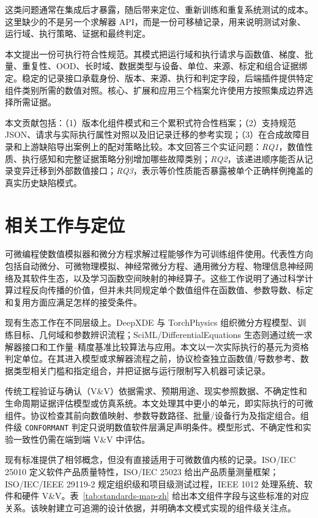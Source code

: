 \documentclass[preprint,12pt,authoryear]{elsarticle}
\begin{document}
这类问题通常在集成后才暴露，随后带来定位、重新训练和重复系统测试的成本。这里缺少的不是另一个求解器 API，而是一份可移植记录，用来说明测试对象、运行域、执行策略、证据和最终判定。

本文提出一份可执行符合性规范。其模式把运行域和执行请求与函数值、梯度、批量、重复性、OOD、长时域、数据类型与设备、单位、来源、标定和组合证据绑定。稳定的记录接口承载身份、版本、来源、执行和判定字段，后端插件提供特定组件类别所需的数值对照。核心、扩展和应用三个档案允许使用方按照集成边界选择所需证据。

本文贡献包括：（1）版本化组件模式和三个累积式符合性档案；（2）支持规范 JSON、请求与实际执行属性对照以及旧记录迁移的参考实现；（3）在合成故障目录和上游缺陷导出案例上的配对策略比较。本文回答三个实证问题：\emph{RQ1}，数值性质、执行感知和完整证据策略分别增加哪些故障类别；\emph{RQ2}，该递进顺序能否从记录变异迁移到外部数值接口；\emph{RQ3}，表示等价性质能否暴露被单个正确样例掩盖的真实历史缺陷模式。

\section{相关工作与定位}
可微编程使数值模拟器和微分方程求解过程能够作为可训练组件使用。代表性方向包括自动微分\citep{baydin2018autodiff}、可微物理模拟\citep{hu2020difftaichi,holl2020control}、神经常微分方程\citep{chen2018neuralode}、通用微分方程\citep{rackauckas2020universal}、物理信息神经网络及其软件生态\citep{raissi2019pinn,lu2021deepxde}，以及学习函数空间映射的神经算子\citep{kovachki2023neuraloperator}。这些工作说明了通过科学计算过程反向传播的价值，但并未共同规定单个数值组件在函数值、参数导数、标定和复用方面应满足怎样的接受条件。

现有生态工作在不同层级上。DeepXDE 与 TorchPhysics 组织微分方程模型、训练目标、几何域和参数辨识流程\citep{lu2021deepxde,tanyu2023deeppde}；SciML/DifferentialEquations 生态则通过统一求解器接口和工作量--精度基准比较算法与应用\citep{rackauckas2019confederated}。本文以一次实际执行的基元为资格判定单位。在其进入模型或求解器流程之前，协议检查独立函数值/导数参考、数据类型相关门槛和指定组合，并把证据与运行限制写入机器可读记录。

传统工程验证与确认（V\&V）依据需求、预期用途、现实参照数据、不确定性和生命周期证据评估模型或仿真系统\citep{nasa2024std7009}。本文处理其中更小的单元，即实际执行的可微组件。协议检查其前向数值映射、参数导数路径、批量/设备行为及指定组合。组件级 \texttt{CONFORMANT} 判定只说明数值软件层满足声明条件。模型形式、不确定性和实验一致性仍需在端到端 V\&V 中评估。

现有标准提供了相邻概念，但没有直接适用于可微数值内核的记录。ISO/IEC 25010 定义软件产品质量特性，ISO/IEC 25023 给出产品质量测量框架\citep{iso25010_2023,iso25023_2016}；ISO/IEC/IEEE 29119-2 规定组织级和项目级测试过程，IEEE 1012 处理系统、软件和硬件 V\&V\citep{iso29119_2_2021,ieee1012_2024}。表~\ref{tab:standards-map-zh} 给出本文组件字段与这些标准的对应关系。该映射建立可追溯的设计依据，并明确本文模式实现的组件级关注点。
\end{document}
